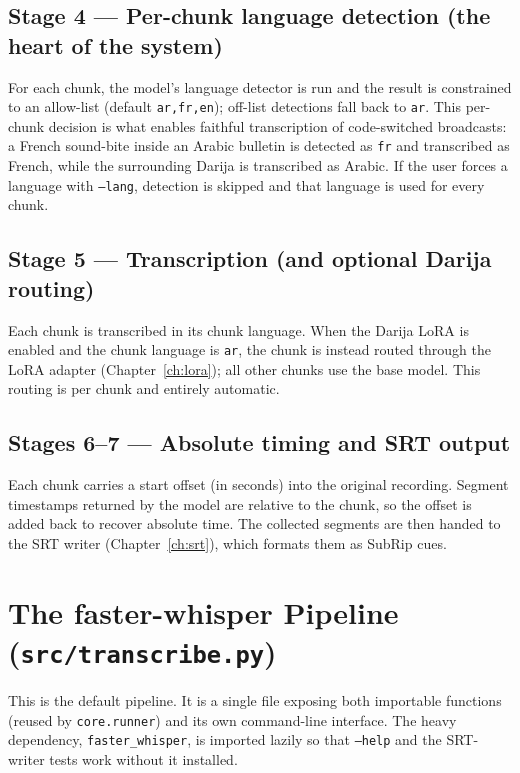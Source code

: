 \documentclass[11pt,a4paper]{report}
\newcommand{\code}[1]{\texttt{\small #1}}
\begin{document}
\section{Stage 4 --- Per-chunk language detection (the heart of the system)}

For each chunk, the model's language detector is run and the result is constrained
to an allow-list (default \code{ar,fr,en}); off-list detections fall back to
\code{ar}. This per-chunk decision is what enables faithful transcription of
code-switched broadcasts: a French sound-bite inside an Arabic bulletin is
detected as \code{fr} and transcribed as French, while the surrounding Darija is
transcribed as Arabic. If the user forces a language with \code{--lang}, detection
is skipped and that language is used for every chunk.

\section{Stage 5 --- Transcription (and optional Darija routing)}

Each chunk is transcribed in its chunk language. When the Darija LoRA is enabled
and the chunk language is \code{ar}, the chunk is instead routed through the LoRA
adapter (Chapter~\ref{ch:lora}); all other chunks use the base model. This routing
is per chunk and entirely automatic.

\section{Stages 6--7 --- Absolute timing and SRT output}

Each chunk carries a start offset (in seconds) into the original recording.
Segment timestamps returned by the model are relative to the chunk, so the offset
is added back to recover absolute time. The collected segments are then handed to
the SRT writer (Chapter~\ref{ch:srt}), which formats them as SubRip cues.

\chapter{The faster-whisper Pipeline (\texttt{src/transcribe.py})}
\label{ch:fw}

This is the default pipeline. It is a single file exposing both importable
functions (reused by \texttt{core.runner}) and its own command-line interface.
The heavy dependency, \code{faster\_whisper}, is imported lazily so that
\code{--help} and the SRT-writer tests work without it installed.
\end{document}
